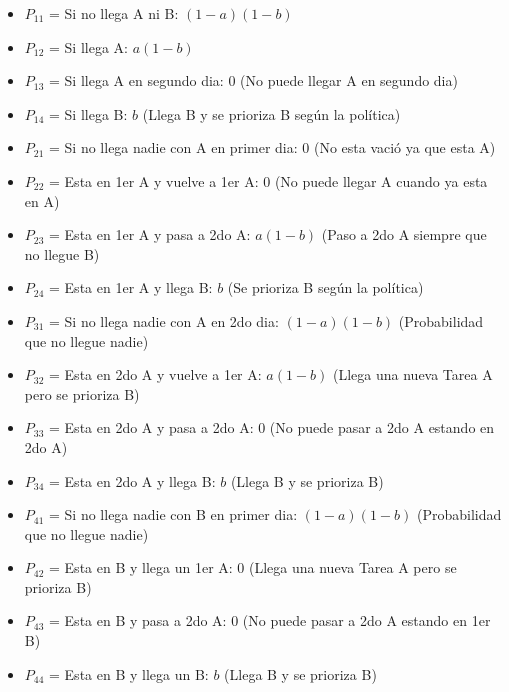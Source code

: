 \documentclass{templateNote}
\begin{document}
\begin{enumerate}[start = 2]
\begin{enumerate}[label = \alph*)]
\begin{center}
            \begin{itemize}
                \item $P_{11}$ = Si no llega A ni B: $(1-a)(1-b)$
                \item $P_{12}$ = Si llega A: $a(1-b)$
                \item $P_{13}$ = Si llega A en segundo dia: $0$ (No puede llegar A en segundo dia)
                \item $P_{14}$ = Si llega B: $b$ (Llega B y se prioriza B según la política) 
                \item $P_{21}$ = Si no llega nadie con A en primer dia: $0$ (No esta vació ya que esta A)
                \item $P_{22}$ = Esta en 1er A y vuelve a 1er A: $0$ (No puede llegar A cuando ya esta en A)
                \item $P_{23}$ = Esta en 1er A y pasa a 2do A: $a(1-b)$ (Paso a 2do A siempre que no llegue B)
                \item $P_{24}$ = Esta en 1er A y llega B: $b$ (Se prioriza B según la política) 
                \item $P_{31}$ = Si no llega nadie con A en 2do dia: $(1-a)(1-b)$ (Probabilidad que no llegue nadie)
                \item $P_{32}$ = Esta en 2do A y vuelve a 1er A: $a(1-b)$ (Llega una nueva Tarea A pero se prioriza B)
                \item $P_{33}$ = Esta en 2do A y pasa a 2do A: $0$ (No puede pasar a 2do A estando en 2do A)
                \item $P_{34}$ = Esta en 2do A y llega B: $b$ (Llega B y se prioriza B)
                \item $P_{41}$ = Si no llega nadie con B en primer dia: $(1-a)(1-b)$ (Probabilidad que no llegue nadie)
                \item $P_{42}$ = Esta en B y llega un 1er A: $0$ (Llega una nueva Tarea A pero se prioriza B)
                \item $P_{43}$ = Esta en B y pasa a 2do A: $0$ (No puede pasar a 2do A estando en 1er B)
                \item $P_{44}$ = Esta en B y llega un B: $b$ (Llega B y se prioriza B)
            \end{itemize}


\end{center}
\end{enumerate}
\end{enumerate}
\end{document}
